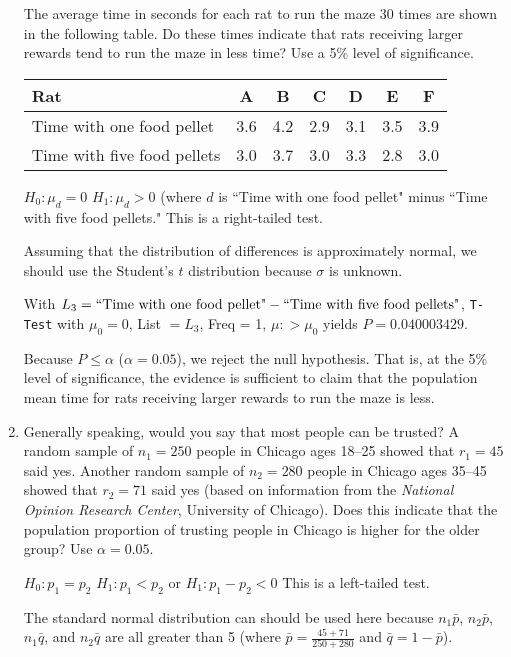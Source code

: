 \begin{enumerate}
The average time in seconds for each rat to run the maze 30 times are shown in the following table.  Do these times indicate that rats receiving larger rewards tend to run the maze in less time?  Use a 5\% level of significance.  

\begin{center}
\begin{tabular}{l|cccccc}
Rat & A & B & C & D & E & F  \\
\hline
Time with one food pellet & 3.6 & 4.2 & 2.9 & 3.1 & 3.5 & 3.9  \\
\hline
Time with five food pellets & 3.0 & 3.7 & 3.0 & 3.3 & 2.8 & 3.0  \\
\end{tabular}
\end{center}

{\answer 
$H_0: \mu_d = 0$  
$H_1: \mu_d > 0$ (where $d$ is ``Time with one food pellet" minus ``Time with five food pellets."  
This is a right-tailed test.
	
Assuming that the distribution of differences is approximately normal, we should use the Student's $t$ distribution because $\sigma$ is unknown.   	
	
With $L_3 = \textnormal{``Time with one food pellet"} - \textnormal{``Time with five food pellets"}$, \texttt{T-Test} with $\mu_0 = 0$, List $=L_3$, Freq = 1, $\mu: > \mu_0$ yields $P = 0.040003429$.   
	
Because $P \leq \alpha$ ($\alpha= 0.05$), we reject the null hypothesis. That is, at the 5\% level of significance, the evidence is sufficient to claim that the population mean time for rats receiving larger rewards to run the maze is less. 
}
 
\vfill

\item Generally speaking, would you say that most people can be trusted? A random sample of $n_1=250$ people in Chicago ages 18--25 showed that $r_1=45$ said yes. Another random sample of $n_2=280$ people in Chicago ages 35--45 showed that $r_2=71$ said yes (based on information from the {\it National Opinion Research Center}, University of Chicago). Does this indicate that the population proportion of trusting people in Chicago is higher for the older group? Use $\alpha = 0.05$.  

{\answer 
$H_0: p_1=p_2$  
$H_1: p_1 < p_2$  or $H_1: p_1 - p_2 < 0$ 
This is a left-tailed test.  
	
The standard normal distribution can should be used here because $n_1\bar{p}$, $n_2\bar{p}$, $n_1\bar{q}$, and $n_2\bar{q}$ are all greater than 5 (where $\bar{p} = \frac{45+71}{250+280}$ and $\bar{q} = 1-\bar{p}$).  

}
\end{enumerate}
